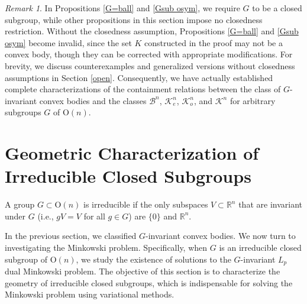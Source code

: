\documentclass[12pt, reqno]{amsart}
\theoremstyle{definition}
\theoremstyle{remark}
\newtheorem{remark}[theorem]{Remark}
\numberwithin{equation}{section}
\newcommand{\On}{\mathrm{O}(n)}
\begin{document}
	
	\begin{remark}
		In Propositions \ref{G=ball} and \ref{Gsub osym}, we require $G$ to be a closed subgroup, while other propositions in this section impose no closedness restriction. Without the closedness assumption, Propositions \ref{G=ball} and \ref{Gsub osym} become invalid, since the set $K$ constructed in the proof may not  be a convex body, though they can be corrected with  appropriate modifications. For brevity, we discuss counterexamples and generalized versions without closedness assumptions in  Section \ref{open}. Consequently, we have actually established complete characterizations of the containment relations between the class of $G$-invariant convex bodies and the classes  $\mathcal{B}^{n}$, $\mathcal{K}^n_{e}$, $\mathcal{K}^n_{o}$, and $\mathcal{K}^n$ for arbitrary subgroups $G$ of $\On$.
	\end{remark}
	
	
	
	
	
	

	
	
	

	

	

	

	


\vspace{1\baselineskip} 
	\section{Geometric Characterization of Irreducible Closed Subgroups}\label{geometry}
	A group $G \subset \On$ is irreducible if the only subspaces $V \subset \mathbb{R}^n$ that are invariant under $G$ (i.e., $gV = V$ for all $g \in G$) are $\{0\}$ and $\mathbb{R}^n$.
	
	In the previous section, we classified  $G$-invariant convex bodies. We now turn to investigating the Minkowski problem. Specifically, when $G$ is an irreducible closed subgroup of $\On$, we study the existence of solutions to the  $G$-invariant $L_{p}$  dual Minkowski problem. The objective of this section is to characterize the geometry of irreducible closed subgroups, which is indispensable for  solving the Minkowski problem using variational methods.
	
\end{document}
